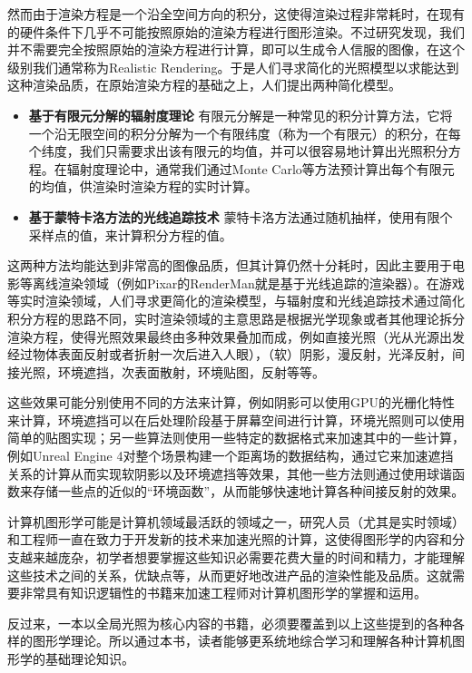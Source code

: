 然而由于渲染方程是一个沿全空间方向的积分，这使得渲染过程非常耗时，在现有的硬件条件下几乎不可能按照原始的渲染方程进行图形渲染。不过研究发现，我们并不需要完全按照原始的渲染方程进行计算，即可以生成令人信服的图像，在这个级别我们通常称为Realistic Rendering。于是人们寻求简化的光照模型以求能达到这种渲染品质，在原始渲染方程的基础之上，人们提出两种简化模型。

\begin{itemize}
	\item \textbf{基于有限元分解的辐射度理论 } 有限元分解是一种常见的积分计算方法，它将一个沿无限空间的积分分解为一个有限纬度（称为一个有限元）的积分，在每个纬度，我们只需要求出该有限元的均值，并可以很容易地计算出光照积分方程。在辐射度理论中，通常我们通过Monte Carlo等方法预计算出每个有限元的均值，供渲染时渲染方程的实时计算。
	\item \textbf{基于蒙特卡洛方法的光线追踪技术 } 蒙特卡洛方法通过随机抽样，使用有限个采样点的值，来计算积分方程的值。
\end{itemize}

这两种方法均能达到非常高的图像品质，但其计算仍然十分耗时，因此主要用于电影等离线渲染领域（例如Pixar的RenderMan就是基于光线追踪的渲染器）。在游戏等实时渲染领域，人们寻求更简化的渲染模型，与辐射度和光线追踪技术通过简化积分方程的思路不同，实时渲染领域的主意思路是根据光学现象或者其他理论拆分渲染方程，使得光照效果最终由多种效果叠加而成，例如直接光照（光从光源出发经过物体表面反射或者折射一次后进入人眼），（软）阴影，漫反射，光泽反射，间接光照，环境遮挡，次表面散射，环境贴图，反射等等。

这些效果可能分别使用不同的方法来计算，例如阴影可以使用GPU的光栅化特性来计算，环境遮挡可以在后处理阶段基于屏幕空间进行计算，环境光照则可以使用简单的贴图实现；另一些算法则使用一些特定的数据格式来加速其中的一些计算，例如Unreal Engine 4对整个场景构建一个距离场的数据结构，通过它来加速遮挡关系的计算从而实现软阴影以及环境遮挡等效果，其他一些方法则通过使用球谐函数来存储一些点的近似的“环境函数”，从而能够快速地计算各种间接反射的效果。

计算机图形学可能是计算机领域最活跃的领域之一，研究人员（尤其是实时领域）和工程师一直在致力于开发新的技术来加速光照的计算，这使得图形学的内容和分支越来越庞杂，初学者想要掌握这些知识必需要花费大量的时间和精力，才能理解这些技术之间的关系，优缺点等，从而更好地改进产品的渲染性能及品质。这就需要非常具有知识逻辑性的书籍来加速工程师对计算机图形学的掌握和运用。

反过来，一本以全局光照为核心内容的书籍，必须要覆盖到以上这些提到的各种各样的图形学理论。所以通过本书，读者能够更系统地综合学习和理解各种计算机图形学的基础理论知识。




